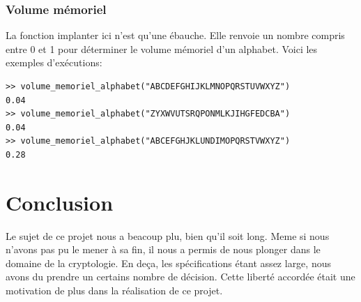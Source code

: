 \documentclass[a4paper, 11pt]{article}
\begin{document}
\subsubsection{Volume mémoriel}
La fonction implanter ici n'est qu'une ébauche. Elle renvoie un nombre
compris entre 0 et 1 pour déterminer le volume mémoriel d'un
alphabet. Voici les exemples d'exécutions:\\

\begin{lstlisting}
>> volume_memoriel_alphabet("ABCDEFGHIJKLMNOPQRSTUVWXYZ")
0.04
>> volume_memoriel_alphabet("ZYXWVUTSRQPONMLKJIHGFEDCBA")
0.04
>> volume_memoriel_alphabet("ABCEFGHJKLUNDIMOPQRSTVWXYZ")
0.28

\end{lstlisting}

\section{Conclusion}
Le sujet de ce projet nous a beacoup plu, bien qu'il soit long.
Meme si nous n'avons pas pu le mener à sa fin, il nous a permis de nous
plonger dans le domaine de la cryptologie.
En deça, les spécifications étant assez large, nous avons du prendre
un certains nombre de décision. Cette liberté accordée était une motivation de plus dans la
réalisation de ce projet.
\end{document}
